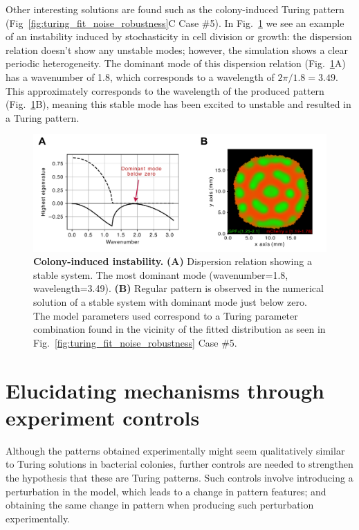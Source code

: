 Other interesting solutions are found such as the colony-induced Turing pattern (Fig~\ref{fig:turing_fit_noise_robustness}C Case \#5).
In Fig.~\ref{fig:colony_induced_turing} we see an example of an instability induced by stochasticity in cell division or growth: the dispersion relation doesn’t show any unstable modes; however, the simulation shows a clear periodic heterogeneity.
The dominant mode of this dispersion relation (Fig.~\ref{fig:colony_induced_turing}A) has a wavenumber of 1.8, which corresponds to a wavelength of $2\pi/1.8=3.49$.
This approximately corresponds to the wavelength of the produced pattern (Fig.~\ref{fig:colony_induced_turing}B), meaning this stable mode has been excited to unstable and resulted in a Turing pattern.


\begin{figure}[H] %
    \centering
    \begin{adjustbox}{center}
        \includegraphics[width=1\textwidth]{chapters/Chapter 3/colony_induced_turing} %
    \end{adjustbox}
    \caption{\textbf{Colony-induced instability.}  \textbf{(A)} Dispersion relation showing a stable system. The most dominant mode (wavenumber=1.8, wavelength=3.49). \textbf{(B)} Regular pattern is observed in the numerical solution of a stable system with dominant mode just below zero. The model parameters used correspond to a Turing parameter combination found in the vicinity of the fitted distribution as seen in Fig.~\ref{fig:turing_fit_noise_robustness} Case \#5.}
    \label{fig:colony_induced_turing}
\end{figure}

\section{Elucidating mechanisms through experiment controls}
Although the patterns obtained experimentally might seem qualitatively similar to Turing solutions in bacterial colonies, further controls are needed to strengthen the hypothesis that these are Turing patterns.
Such controls involve introducing a perturbation in the model, which leads to a change in pattern features; and obtaining the same change in pattern when producing such perturbation experimentally.

